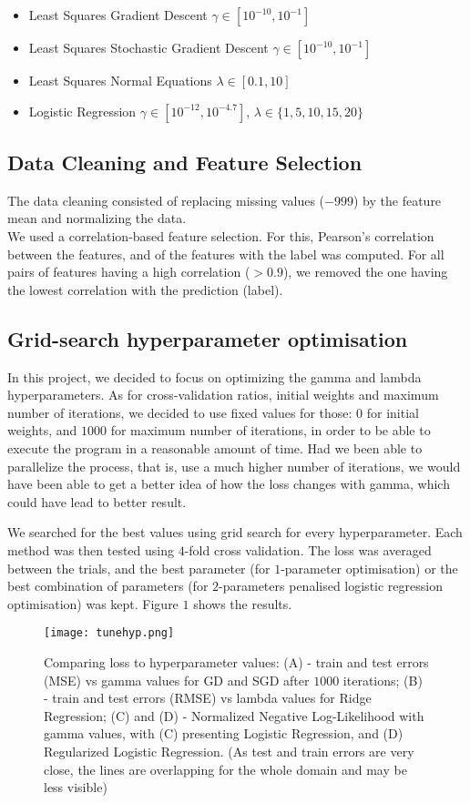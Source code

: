 \documentclass{article}
\begin{document}
	\begin{itemize}
		\item Least Squares Gradient Descent $\gamma \in [10^{-10}, 10^{-1}]$
		\item Least Squares Stochastic Gradient Descent $\gamma \in [10^{-10}, 10^{-1}]$
		\item Least Squares Normal Equations $\lambda \in [0.1, 10]$
		\item Logistic Regression $\gamma \in [10^{-12}, 10^{-4.7}]$, $\lambda \in \{1, 5, 10, 15, 20\} $
	\end{itemize}
	
	
	\subsection{Data Cleaning and Feature Selection}
	The data cleaning consisted of replacing missing values ($-999$) by the feature mean and normalizing the data.
	\\
	We used a correlation-based feature selection. For this, Pearson’s correlation between the features, and of the features with the label was computed. For all pairs of features having a high correlation ($> 0.9$), we removed the one having the lowest correlation with the prediction (label).
	
	\subsection{Grid-search hyperparameter optimisation}
	In this project, we decided to focus on optimizing the gamma and lambda hyperparameters. As for cross-validation ratios, initial weights and maximum number of iterations, we decided to use fixed values for those: $0$ for initial weights, and $1000$ for maximum number of iterations, in order to be able to execute the program in a reasonable amount of time. Had we been able to parallelize the process, that is, use a much higher number of iterations, we would have been able to get a better idea of how the loss changes with gamma, which could have lead to better result.
	
	We searched for the best values using grid search for every hyperparameter. Each method was then tested using $4$-fold cross validation. The loss was averaged between the trials, and the best parameter (for $1$-parameter optimisation) or the best combination of parameters (for $2$-parameters penalised logistic regression optimisation) was kept. Figure $1$ shows the results.
	
	\begin{figure}[h]
		\label{fig1}
		\centering
		\texttt{[image: tunehyp.png]}
		\caption{Comparing loss to hyperparameter values:
			(A) - train and test errors (MSE) vs gamma values for GD and SGD after $1000$ iterations;
			(B) - train and test errors (RMSE) vs lambda values for Ridge Regression;
			(C) and (D) - Normalized Negative Log-Likelihood with gamma values, with (C) presenting Logistic Regression, and (D) Regularized Logistic Regression.
		(As test and train errors are very close, the lines are overlapping for the whole domain and may be less visible)}
	\end{figure}
	
\end{document}
